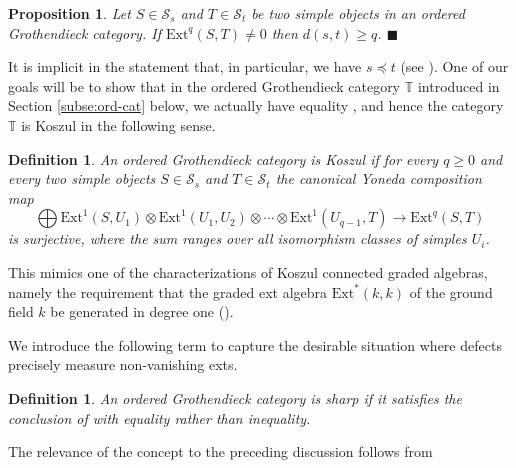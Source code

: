 \documentclass[11pt]{article}
\theoremstyle{plain}
\newtheorem{proposition}[lemma]{Proposition}
\theoremstyle{nonumberplain}
\theoremstyle{plain}
\newtheorem{definition}[lemma]{Definition}
\numberwithin{equation}{section}
\theoremstyle{nonumberplain}
\newcommand\bT{{\mathbb T}}
\newcommand\cS{{\mathcal S}}
\newcommand\1{{\bf 1}}
\newcommand{\qedhere}{\mbox{}\hfill\ensuremath{\blacksquare}}
\begin{document}
\begin{proposition}\label{pr.def-ge}
  Let $S\in \cS_s$ and $T\in \cS_t$ be two simple objects in an ordered Grothendieck category. If $\mathrm{Ext}^q(S,T)\ne 0$ then $d(s,t)\ge q$. \qedhere
\end{proposition}

It is implicit in the statement that, in particular, we have $s\preceq t$ (see \cite[Lemma 3.8]{us0}). One of our goals will be to show that in the ordered Grothendieck category $\bT$ introduced in Section \ref{subse:ord-cat} below, we actually have equality%
, and hence the category $\bT$ is Koszul in the following sense.

\begin{definition}\label{def.ksz}
  An ordered Grothendieck category is {\it Koszul} if for every $q\ge 0$ and every two simple objects $S\in \cS_s$ and $T\in \cS_t$ the canonical Yoneda composition map
  \begin{equation*}
    \bigoplus\mathrm{Ext}^1(S,U_1)\otimes \mathrm{Ext}^1(U_1,U_2)\otimes\cdots\otimes \mathrm{Ext}^1(U_{q-1},T)\to \mathrm{Ext}^q(S,T) 
  \end{equation*}
  is surjective, where the sum ranges over all isomorphism classes of simples $U_i$.  
\end{definition}

This mimics one of the characterizations of Koszul connected graded algebras, namely the requirement that the graded ext algebra $\mathrm{Ext}^*(k,k)$ of the ground field $k$ be generated in degree one (\cite[\S 2.1]{PP}). 

We introduce the following term to capture the desirable situation where defects precisely measure non-vanishing exts.

\begin{definition}\label{def.shrp}
  An ordered Grothendieck category is {\it sharp} if it satisfies the conclusion of  with equality rather than inequality. 
\end{definition}

The relevance of the concept to the preceding discussion follows from
\end{document}
